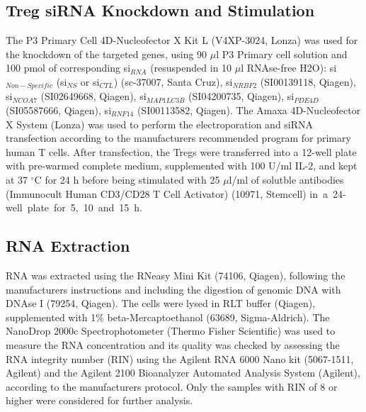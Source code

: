 \documentclass[oneside, 10pt, a4paper, twocolumn]{article}
\begin{document}
{\subsection{Treg siRNA Knockdown and Stimulation} 
The P3 Primary Cell 4D-Nucleofector X Kit L (V4XP-3024, Lonza) was used for the knockdown of the targeted genes, using 90 $\mu$l P3 Primary cell solution and 100 pmol of corresponding si$_{RNA}$ (resuspended in 10 $\mu$l RNAse-free H2O): si$_{Non-Specific}$ (si$_{NS}$ or si$_{CTL}$) (sc-37007, Santa Cruz), si$_{NRBF2}$ (SI00139118, Qiagen), si$_{NCOA7}$ (SI02649668, Qiagen), si$_{MAP1LC3B}$ (SI04200735, Qiagen), si$_{PDE4D}$ (SI05587666, Qiagen), si$_{RNF14}$ (SI00113582, Qiagen). The Amaxa 4D-Nucleofector X System (Lonza) was used to perform the electroporation and siRNA transfection according to the manufacturers recommended program for primary human T cells. After transfection, the Tregs were transferred into a 12-well plate with pre-warmed complete medium, supplemented with 100 U/ml IL-2, and kept at 37 $^\circ$C for 24 h before being stimulated with 25 $\mu$l/ml of solutble antibodies (Immunocult Human CD3/CD28 T Cell Activator) (10971, Stemcell) \mbox{in a 24-well plate for 5, 10 and 15 h.}

\subsection{RNA Extraction}
RNA was extracted using the RNeasy Mini Kit (74106, Qiagen), following the manufacturers instructions and including the digestion of genomic DNA with DNAse I (79254, Qiagen). The cells were lysed in RLT buffer (Qiagen), supplemented with 1$\%$ beta-Mercaptoethanol (63689, Sigma-Aldrich). The NanoDrop 2000c Spectrophotometer (Thermo Fisher Scientific) was used to measure the RNA concentration and its quality was checked by assessing the RNA integrity number (RIN) using the Agilent RNA 6000 Nano kit (5067-1511, Agilent) and the Agilent 2100 Bioanalyzer Automated Analysis System (Agilent), according to the manufacturers protocol. Only the samples with RIN of 8 or higher were considered for further analysis.

}
\end{document}
